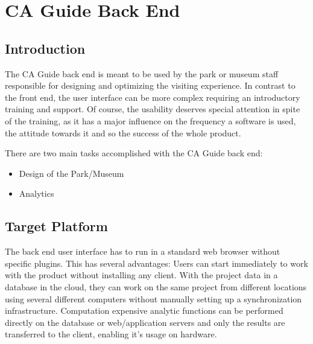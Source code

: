 
\chapter{CA Guide Back End} %

\label{backend} %



\section{Introduction}

The CA Guide back end is meant to be used by the park or museum staff responsible for designing and optimizing the visiting experience. In contrast to the front end, the user interface can be more complex requiring an introductory training and support. Of course, the usability deserves special attention in spite of the training, as it has a major influence on the frequency a software is used, the attitude towards it and so the success of the whole product. %

There are two main tasks accomplished with the CA Guide back end:

\begin{itemize}
\item Design of the Park/Museum
\item Analytics
\end{itemize}


\section{Target Platform}

The back end user interface has to run in a standard web browser without specific plugins. This has several advantages: Users can start immediately to work with the product without installing any client. With the project data in a database in the cloud, they can work on the same project from different locations using several different computers without manually setting up a synchronization infrastructure. Computation expensive analytic functions can be performed directly on the database or web/application servers and only the results are transferred to the client, enabling it's usage on  hardware.

